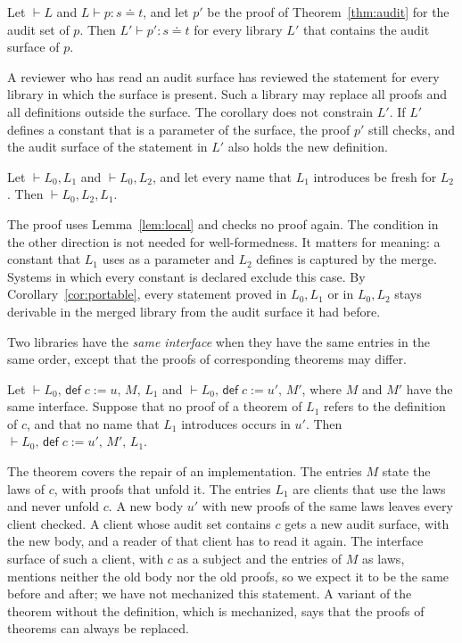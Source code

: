 \documentclass[acmsmall,nonacm,screen]{acmart}
\newcommand{\eqd}{\doteq}
\newcommand{\kw}[1]{\mathsf{#1}}
\newcommand{\chk}[4]{#1 \vdash #2 : #3 \eqd #4}
\newcommand{\wf}[1]{\vdash #1}
\begin{document}
\begin{corollary}[Portability]
\label{cor:portable}
Let $\wf{L}$ and $\chk{L}{p}{s}{t}$, and let $p'$ be the proof of Theorem~\ref{thm:audit} for
the audit set of $p$. Then $\chk{L'}{p'}{s}{t}$ for every library $L'$ that contains the audit
surface of $p$.
\end{corollary}

A reviewer who has read an audit surface has reviewed the statement for every library in which
the surface is present. Such a library may replace all proofs and all definitions outside the
surface. The corollary does not constrain $L'$. If $L'$ defines a constant that is a parameter
of the surface, the proof $p'$ still checks, and the audit surface of the statement in $L'$ also
holds the new definition.

\begin{theorem}[Merging]
\label{thm:merge}
Let $\wf{L_0, L_1}$ and $\wf{L_0, L_2}$, and let every name that $L_1$ introduces be fresh for
$L_2$. Then $\wf{L_0, L_2, L_1}$.
\end{theorem}

The proof uses Lemma~\ref{lem:local} and checks no proof again. The condition in the other
direction is not needed for well-formedness. It matters for meaning: a constant that $L_1$ uses
as a parameter and $L_2$ defines is captured by the merge. Systems in which every constant is
declared exclude this case. By Corollary~\ref{cor:portable}, every statement proved in $L_0, L_1$
or in $L_0, L_2$ stays derivable in the merged library from the audit surface it had before.

Two libraries have the \emph{same interface} when they have the same entries in the same order,
except that the proofs of corresponding theorems may differ.

\begin{theorem}[Replacement]
\label{thm:replace}
Let $\wf{L_0,\, \kw{def}\;c := u,\, M,\, L_1}$ and $\wf{L_0,\, \kw{def}\;c := u',\, M'}$, where
$M$ and $M'$ have the same interface. Suppose that no proof of a theorem of $L_1$ refers to the
definition of $c$, and that no name that $L_1$ introduces occurs in $u'$. Then
$\wf{L_0,\, \kw{def}\;c := u',\, M',\, L_1}$.
\end{theorem}

The theorem covers the repair of an implementation. The entries $M$ state the laws of $c$, with
proofs that unfold it. The entries $L_1$ are clients that use the laws and never unfold $c$. A
new body $u'$ with new proofs of the same laws leaves every client checked. A client whose audit
set contains $c$ gets a new audit surface, with the new body, and a reader of that client has to
read it again. The interface surface of such a client, with $c$ as a subject and the entries of
$M$ as laws, mentions neither the old body nor the old proofs, so we expect it to be the same
before and after; we have not mechanized this statement. A variant of the theorem without the
definition, which is mechanized, says that the proofs of theorems can always be replaced.
\end{document}

